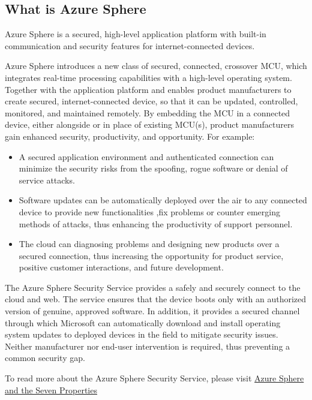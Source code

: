 \subsection{What is Azure Sphere}
Azure Sphere is a secured, high-level application platform with built-in communication and security features for internet-connected devices.

Azure Sphere introduces a new class of secured, connected, crossover MCU, which integrates real-time processing capabilities with a high-level 
operating system. Together with the application platform and enables product manufacturers to create secured, internet-connected device, so that
it can be updated, controlled, monitored, and maintained remotely. By embedding the MCU in a connected device, either alongside or in place of 
existing MCU(s), product manufacturers gain enhanced security, productivity, and opportunity. For example:
\begin{itemize}
    \item A secured application environment and authenticated connection can minimize the security risks from the spoofing, rogue software or denial of 
    service attacks.
    \item Software updates can be automatically deployed over the air to any connected device to provide new functionalities ,fix problems or counter 
    emerging methods of attacks, thus enhancing the productivity of support personnel.
    \item The cloud can diagnosing problems and designing new products over a secured connection, thus increasing the opportunity for product service, 
    positive customer interactions, and future development.
\end{itemize}

The Azure Sphere Security Service provides a safely and securely connect to the cloud and web. The service ensures that the device boots only with an authorized 
version of genuine, approved software. In addition, it provides a secured channel through which Microsoft can automatically download and install operating system 
updates to deployed devices in the field to mitigate security issues. Neither manufacturer nor end-user intervention is required, thus preventing a common security gap.

To read more about the Azure Sphere Security Service, please visit \href{https://docs.microsoft.com/en-us/azure-sphere/product-overview/azure-sphere-seven-properties}{Azure Sphere and the Seven Properties}

